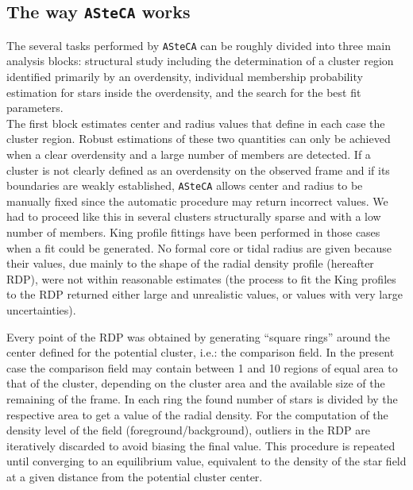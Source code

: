 \documentclass[draft]{aa}
\begin{document}
\subsection{The way \texttt{ASteCA} works}
\label{ssec:asteca_works}

The several tasks performed by \texttt{ASteCA} can be roughly divided into three
main analysis blocks: structural study including the determination of a cluster
region identified primarily by an overdensity, individual membership probability
estimation for stars inside the overdensity, and the search for the best fit
parameters.\\

The first block estimates center and radius values 
that define in each case the cluster region. Robust estimations
of these two quantities can only be achieved when a clear overdensity and a
large number of members are detected. If a cluster is not
clearly defined as an overdensity on the observed frame and if its boundaries
are weakly established, \texttt{ASteCA} allows center and radius to be manually
fixed since the automatic procedure may return incorrect values. We had to
proceed like this in several clusters structurally sparse and with a low number
of members.  King profile fittings have been performed in those cases when a
fit could be generated. No formal core or tidal radius are given because their
values, due mainly to the shape of the radial density profile (hereafter RDP),
were not within reasonable estimates (the process to fit the King profiles to
the RDP returned either large and unrealistic values, or values with very
large uncertainties).

Every point of the RDP was obtained by generating ``square rings'' around the
center defined for the potential cluster, i.e.: the comparison field.
In the present case the comparison field may contain between 1 and 10 regions
of equal area to that of the cluster, depending on the cluster area and the
available size of the remaining of the frame.
In each ring the found number of stars is divided by the respective area
to get a value of the radial density. For the computation of the density
level of the field (foreground/background), outliers in the RDP are iteratively
discarded to avoid biasing the final value. This procedure is repeated until
converging to an equilibrium value, equivalent to the density of the star field
at a given distance from the potential cluster center.\\
\end{document}
